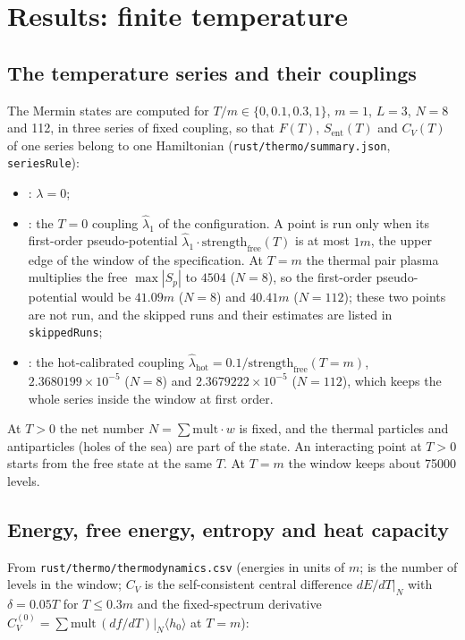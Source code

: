 \documentclass[11pt]{article}
\begin{document}
\section{Results: finite temperature}

\subsection{The temperature series and their couplings}

The Mermin states are computed for $T/m\in\{0,0.1,0.3,1\}$, $m=1$, $L=3$, $N=8$ and 112, in three series of fixed coupling, so that $F(T)$, $S_{\mathrm{ent}}(T)$ and $C_V(T)$ of one series belong to one Hamiltonian (\texttt{rust/the\allowbreak{}rmo/summ\allowbreak{}ary.json}, \texttt{seriesRu\allowbreak{}le}):

\begin{itemize}
\item \texttt{}: $\lambda=0$;
\item \texttt{}: the $T=0$ coupling $\hat\lambda_1$ of the configuration. A point is run only when its first-order pseudo-potential $\hat\lambda_1\cdot\mathrm{strength}_{\mathrm{free}}(T)$ is at most $1m$, the upper edge of the window of the specification. At $T=m$ the thermal pair plasma multiplies the free $\max|S_p|$ to $4504$ ($N=8$), so the first-order pseudo-potential would be $41.09m$ ($N=8$) and $40.41m$ ($N=112$); these two points are not run, and the skipped runs and their estimates are listed in \texttt{skippedR\allowbreak{}uns};
\item \texttt{}: the hot-calibrated coupling $\hat\lambda_{\mathrm{hot}}=0.1/\mathrm{strength}_{\mathrm{free}}(T=m)$, $2.3680199\times10^{-5}$ ($N=8$) and $2.3679222\times10^{-5}$ ($N=112$), which keeps the whole series inside the window at first order.
\end{itemize}

At $T>0$ the net number $N=\sum\mathrm{mult}\cdot w$ is fixed, and the thermal particles and antiparticles (holes of the sea) are part of the state. An interacting point at $T>0$ starts from the free state at the same $T$. At $T=m$ the window keeps about 75000 levels.

\subsection{Energy, free energy, entropy and heat capacity}

From \texttt{rust/the\allowbreak{}rmo/ther\allowbreak{}modynami\allowbreak{}cs.csv} (energies in units of $m$; \texttt{} is the number of levels in the window; $C_V$ is the self-consistent central difference $dE/dT|_N$ with $\delta=0.05T$ for $T\le0.3m$ and the fixed-spectrum derivative $C_V^{(0)}=\sum\mathrm{mult}\,(df/dT)|_N\langle h_0\rangle$ at $T=m$):
\end{document}
